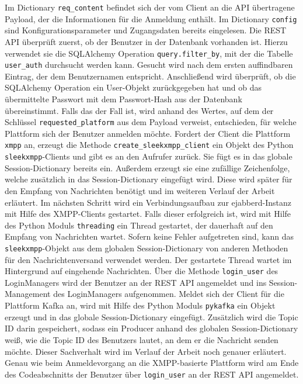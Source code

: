 \documentclass[a4paper,titlepage,halfparskip,12pt]{scrreprt}
\begin{document}
\begin{onehalfspacing}
Im Dictionary \texttt{req\_content} befindet sich der vom Client an die \acs{API} übertragene Payload, der die Informationen für die Anmeldung enthält. Im Dictionary \texttt{config} sind Konfigurationsparameter und Zugangsdaten bereits eingelesen. Die \acs{REST} \acs{API} überprüft zuerst, ob der Benutzer in der Datenbank vorhanden ist. Hierzu verwendet sie die SQLAlchemy Operation \texttt{query.filter\_by}, mit der die Tabelle \texttt{user\_auth} durchsucht werden kann. Gesucht wird nach dem ersten auffindbaren Eintrag, der dem Benutzernamen entspricht. Anschließend wird überprüft, ob die SQLAlchemy Operation ein User-Objekt zurückgegeben hat und ob das übermittelte Passwort mit dem Passwort-Hash aus der Datenbank übereinstimmt. Falls das der Fall ist, wird anhand des Wertes, auf dem der Schlüssel \texttt{requested\_platform} aus dem Payload verweist, entschieden, für welche Plattform sich der Benutzer anmelden möchte. Fordert der Client die Plattform \texttt{xmpp} an, erzeugt die Methode \texttt{create\_sleekxmpp\_client} ein Objekt des Python \texttt{sleekxmpp}-Clients und gibt es an den Aufrufer zurück. Sie fügt es in das globale Session-Dictionary bereits ein. Außerdem erzeugt sie eine zufällige Zeichenfolge, welche zusätzlich in das Session-Dictionary eingefügt wird. Diese wird später für den Empfang von Nachrichten benötigt und im weiteren Verlauf der Arbeit erläutert. Im nächsten Schritt wird ein Verbindungsaufbau zur ejabberd-Instanz mit Hilfe des \acs{XMPP}-Clients gestartet. Falls dieser erfolgreich ist, wird mit Hilfe des Python Moduls \texttt{threading} \cite{pythonThreading} ein Thread gestartet, der dauerhaft auf den Empfang von Nachrichten wartet. Sofern keine Fehler aufgetreten sind, kann das \texttt{sleekxmpp}-Objekt aus dem globalen Session-Dictionary von anderen Methoden für den Nachrichtenversand verwendet werden. Der gestartete Thread wartet im Hintergrund auf eingehende Nachrichten. Über die Methode \texttt{login\_user} des LoginManagers wird der Benutzer an der \acs{REST} \acs{API} angemeldet und ins Session-Management des LoginManagers aufgenommen.
Meldet sich der Client für die Plattform Kafka an, wird mit Hilfe des Python Moduls \texttt{pykafka} ein Objekt erzeugt und in das globale Session-Dictionary eingefügt. Zusätzlich wird die Topic ID darin gespeichert, sodass ein Producer anhand des globalen Session-Dictionary weiß, wie die Topic ID des Benutzers lautet, an dem er die Nachricht senden möchte. Dieser Sachverhalt wird im Verlauf der Arbeit noch genauer erläutert. Genau wie beim Anmeldevorgang an die \acs{XMPP}-basierte Plattform wird am Ende des Codeabschnitts der Benutzer über \texttt{login\_user} an der \acs{REST} \acs{API} angemeldet.


\end{onehalfspacing}
\end{document}
